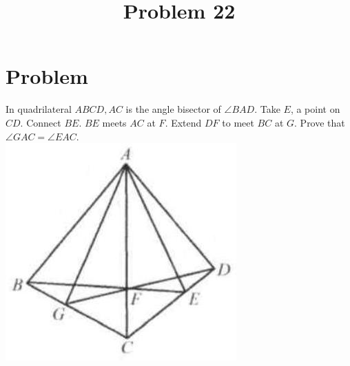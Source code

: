 \documentclass{article}
\title{Problem 22}
\date{}
\begin{document}
\maketitle

\section*{Problem}
In quadrilateral \(A B C D, A C\) is the angle bisector of \(\angle B A D\). Take \(E\), a point on \(C D\). Connect \(B E\). \(B E\) meets \(A C\) at \(F\). Extend \(D F\) to meet \(B C\) at \(G\). Prove that \(\angle G A C=\angle E A C\).\\
\centering
\includegraphics[width=\textwidth]{images/130.jpg}
\end{document}
